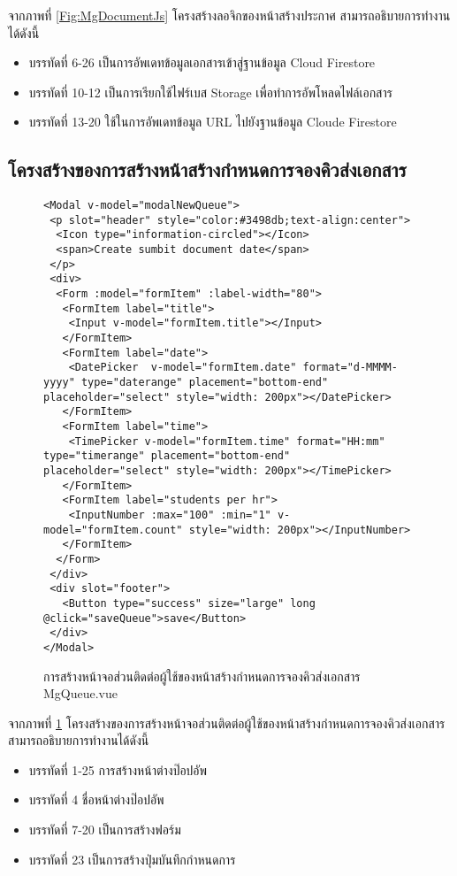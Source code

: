 		จากภาพที่ \ref{Fig:MgDocumentJs} โครงสร้างลอจิกของหน้าสร้างประกาศ สามารถอธิบายการทำงานได้ดังนี้
		\begin{itemize}[label={--}]
			\item บรรทัดที่ 6-26 เป็นการอัพเดทข้อมูลเอกสารเข้าสู่ฐานข้อมูล Cloud Firestore
			\item บรรทัดที่ 10-12 เป็นการเรียกใช้ไฟร์เบส Storage เพื่อทำการอัพโหลดไฟล์เอกสาร
			\item บรรทัดที่ 13-20 ใช้ในการอัพเดทข้อมูล URL ไปยังฐานข้อมูล Cloude Firestore
		\end{itemize}
		
		\subsection{โครงสร้างของการสร้างหน้าสร้างกำหนดการจองคิวส่งเอกสาร}
		\begin{figure}[H]
			{\begin{lstlisting}
<Modal v-model="modalNewQueue">
 <p slot="header" style="color:#3498db;text-align:center">
  <Icon type="information-circled"></Icon>
  <span>Create sumbit document date</span>
 </p>
 <div>
  <Form :model="formItem" :label-width="80">
   <FormItem label="title">
    <Input v-model="formItem.title"></Input>
   </FormItem>
   <FormItem label="date">
    <DatePicker  v-model="formItem.date" format="d-MMMM-yyyy" type="daterange" placement="bottom-end" placeholder="select" style="width: 200px"></DatePicker>
   </FormItem>
   <FormItem label="time">
    <TimePicker v-model="formItem.time" format="HH:mm" type="timerange" placement="bottom-end" placeholder="select" style="width: 200px"></TimePicker>
   </FormItem>
   <FormItem label="students per hr">
    <InputNumber :max="100" :min="1" v-model="formItem.count" style="width: 200px"></InputNumber>
   </FormItem>
  </Form>
 </div>
 <div slot="footer">
   <Button type="success" size="large" long @click="saveQueue">save</Button>
 </div>
</Modal>
				\end{lstlisting}}
			\caption{การสร้างหน้าจอส่วนติดต่อผู้ใช้ของหน้าสร้างกำหนดการจองคิวส่งเอกสาร MgQueue.vue}
			\label{Fig:MgQueue}
		\end{figure}
		จากภาพที่ \ref{Fig:MgQueue} โครงสร้างของการสร้างหน้าจอส่วนติดต่อผู้ใช้ของหน้าสร้างกำหนดการจองคิวส่งเอกสาร สามารถอธิบายการทำงานได้ดังนี้
		\begin{itemize}[label={--}]
			\item บรรทัดที่ 1-25 การสร้างหน้าต่างป๊อปอัพ
			\item บรรทัดที่ 4 ชื่อหน้าต่างป๊อปอัพ
			\item บรรทัดที่ 7-20 เป็นการสร้างฟอร์ม
			\item บรรทัดที่ 23 เป็นการสร้างปุ่มบันทึกกำหนดการ
		\end{itemize}
